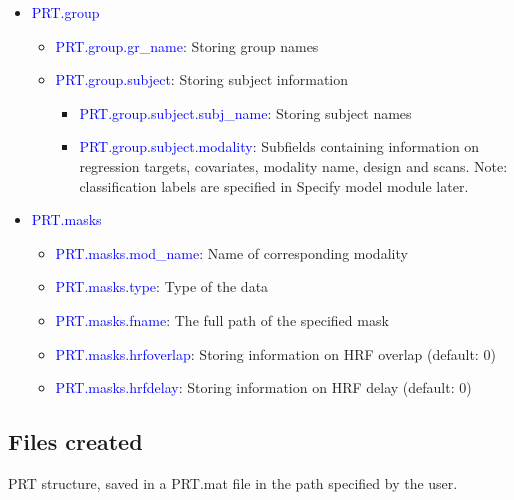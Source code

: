 \begin{itemize}
\item \textcolor{blue}{PRT.group}

\begin{itemize}
\item \textcolor{blue}{PRT.group.gr\_name}: Storing group names
\item \textcolor{blue}{PRT.group.subject}: Storing subject information

\begin{itemize}
\item \textcolor{blue}{PRT.group.subject.subj\_name}: Storing subject names
\item \textcolor{blue}{PRT.group.subject.modality}: Subfields containing information on regression targets, covariates, modality name, design and scans. Note: classification labels are specified in Specify model module later.


\end{itemize}
\end{itemize}

\item \textcolor{blue}{PRT.masks}

\begin{itemize}
\item \textcolor{blue}{PRT.masks.mod\_name}: Name of corresponding modality
\item \textcolor{blue}{PRT.masks.type}: Type of the data
\item \textcolor{blue}{PRT.masks.fname}: The full path of the specified mask
\item \textcolor{blue}{PRT.masks.hrfoverlap}: Storing information on HRF overlap (default: 0)
\item \textcolor{blue}{PRT.masks.hrfdelay}: Storing information on HRF delay (default: 0)

\end{itemize}
\end{itemize}



\subsection{Files created}

PRT structure, saved in a PRT.mat file in the path specified by the user.



